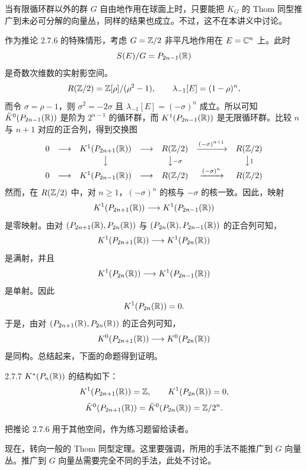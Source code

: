 \begin{remark}{}
  当有限循环群以外的群 $G$ 自由地作用在球面上时，只要能把 $K_G$ 的 Thom 同型推广到未必可分解的向量丛，同样的结果也成立。不过，这不在本讲义中讨论。
\end{remark}

作为推论 2.7.6 的特殊情形，考虑 $G=\mathbb{Z}/2$ 非平凡地作用在 $E=\mathbb{C}^n$ 上。此时
\[
S(E)/G=P_{2n-1}(\mathbb{R})
\]
是奇数次维数的实射影空间。
\[
R(\mathbb{Z}/2)=\mathbb{Z}[\rho]/(\rho^2-1),\qquad \lambda_{-1}[E]=(1-\rho)^n,
\]
而令 $\sigma=\rho-1$，则 $\sigma^2=-2\sigma$ 且 $\lambda_{-1}[E]=(-\sigma)^n$ 成立。所以可知 $\tilde K^0(P_{2n-1}(\mathbb{R}))$ 是阶为 $2^{n-1}$ 的循环群，而 $K^1(P_{2n-1}(\mathbb{R}))$ 是无限循环群。比较 $n$ 与 $n+1$ 对应的正合列，得到交换图
\[
\begin{array}{ccccccc}
0 & \longrightarrow & K^1(P_{2n+1}(\mathbb{R})) & \longrightarrow & R(\mathbb{Z}/2)
& \xrightarrow{(-\sigma)^{n+1}} & R(\mathbb{Z}/2)\\[2pt]
& & \big\downarrow & & \big\downarrow{\scriptstyle-\sigma} & & \big\downarrow{\scriptstyle 1}\\[2pt]
0 & \longrightarrow & K^1(P_{2n-1}(\mathbb{R})) & \longrightarrow & R(\mathbb{Z}/2)
& \xrightarrow{(-\sigma)^{n}} & R(\mathbb{Z}/2)
\end{array}
\]
然而，在 $R(\mathbb{Z}/2)$ 中，对 $n\ge1$，$(-\sigma)^n$ 的核与 $-\sigma$ 的核一致。因此，映射
\[
K^1(P_{2n+1}(\mathbb{R}))\longrightarrow K^1(P_{2n-1}(\mathbb{R}))
\]
是零映射。由对 $(P_{2n+1}(\mathbb{R}),P_{2n}(\mathbb{R}))$ 与 $(P_{2n}(\mathbb{R}),P_{2n-1}(\mathbb{R}))$ 的正合列可知，
\[
K^1(P_{2n+1}(\mathbb{R}))\longrightarrow K^1(P_{2n}(\mathbb{R}))
\]
是满射，并且
\[
K^1(P_{2n}(\mathbb{R}))\longrightarrow K^1(P_{2n-1}(\mathbb{R}))
\]
是单射。因此
\[
K^1(P_{2n}(\mathbb{R}))=0.
\]
于是，由对 $(P_{2n+1}(\mathbb{R}),P_{2n}(\mathbb{R}))$ 的正合列可知，
\[
K^0(P_{2n+1}(\mathbb{R}))\longrightarrow K^0(P_{2n}(\mathbb{R}))
\]
是同构。总结起来，下面的命题得到证明。


\begin{proposition*}{2.7.7}
  $K^*(P_n(\mathbb{R}))$ 的结构如下：
  \[
  K^1(P_{2n+1}(\mathbb{R}))=\mathbb{Z},\qquad K^1(P_{2n}(\mathbb{R}))=0,
  \]
  \[
  \tilde K^0(P_{2n+1}(\mathbb{R}))=\tilde K^0(P_{2n}(\mathbb{R}))=\mathbb{Z}/2^n.
  \]
\end{proposition*}

把推论 2.7.6 用于其他空间，作为练习题留给读者。

现在，转向一般的 Thom 同型定理。这里要强调，所用的手法不能推广到 $G$ 向量丛。推广到 $G$ 向量丛需要完全不同的手法，此处不讨论。


